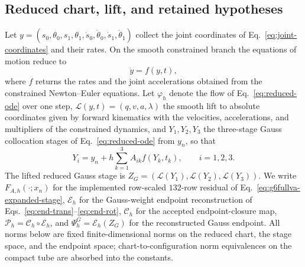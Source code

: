 \documentclass[preprint,12pt]{elsarticle}
\begin{document}
\subsection{Reduced chart, lift, and retained hypotheses}

Let $y=(s_0,\theta_0,s_1,\theta_1,\dot s_0,\dot\theta_0,\dot s_1,\dot\theta_1)$
collect the joint coordinates of Eq.~\eqref{eq:joint-coordinates} and their
rates. On the smooth constrained branch the equations of motion reduce to
\begin{equation}
  \dot y=f(y,t),
  \label{eq:reduced-ode}
\end{equation}
where $f$ returns the rates and the joint accelerations obtained from the
constrained Newton--Euler equations. Let $\varphi_h$ denote the flow of
Eq.~\eqref{eq:reduced-ode} over one step, $\mathcal L(y,t)=(q,v,a,\lambda)$
the smooth lift to absolute coordinates given by forward kinematics with the
velocities, accelerations, and multipliers of the constrained dynamics, and
$Y_1,Y_2,Y_3$ the three-stage Gauss collocation stages of
Eq.~\eqref{eq:reduced-ode} from $y_n$, so that
\begin{equation}
  Y_i=y_n+h\sum_{k=1}^3A_{ik}f(Y_k,t_k),\qquad i=1,2,3 .
  \label{eq:reduced-gauss-stages}
\end{equation}
The lifted reduced Gauss stage is $Z_G=(\mathcal L(Y_1),\mathcal L(Y_2),
\mathcal L(Y_3))$. We write $F_{A,h}(\cdot;x_n)$ for the implemented
row-scaled $132$-row residual of Eq.~\eqref{eq:g6fullva-expanded-stage},
$\mathcal E_h$ for the Gauss-weight endpoint reconstruction of
Eqs.~\eqref{eq:end-trans}--\eqref{eq:end-rot}, $\mathcal C_h$ for the
accepted endpoint-closure map, $\mathcal P_h=\mathcal C_h\circ\mathcal E_h$,
and $\Psi_h^G=\mathcal E_h(Z_G)$ for the reconstructed Gauss endpoint. All
norms below are fixed finite-dimensional norms on the reduced chart, the
stage space, and the endpoint space; chart-to-configuration norm
equivalences on the compact tube are absorbed into the constants.
\end{document}
